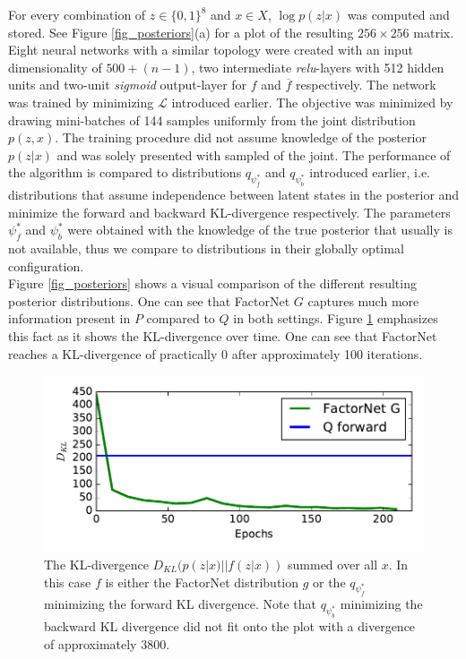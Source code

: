 For every combination of $z \in \{0,1\}^8$ and $x \in X$, $\log p(z|x)$ was computed and stored. See Figure \ref{fig_posteriors}(a) for a plot of the resulting $256 \times 256$ matrix.\\
Eight neural networks with a similar topology were created with an input dimensionality of $500 + (n-1)$, two intermediate \emph{relu}-layers with 512 hidden units and two-unit \emph{sigmoid} output-layer for $f$ and $\overline{f}$ respectively. The network was trained by minimizing $\mathcal{L}$ introduced earlier. The objective was minimized by drawing mini-batches of 144 samples uniformly from the joint distribution $p(z,x)$. The training procedure did not assume knowledge of the posterior $p(z|x)$ and was solely presented with sampled of the joint. The performance of the algorithm is compared to distributions $q_{\psi^*_f}$ and $q_{\psi^*_b}$ introduced earlier, i.e. distributions that assume independence between latent states in the posterior and minimize the forward and backward KL-divergence respectively. The parameters $\psi^*_f$ and $\psi^*_b$ were obtained with the knowledge of the true posterior that usually is not available, thus we compare to distributions in their globally optimal configuration.\\
Figure \ref{fig_posteriors} shows a visual comparison of the different resulting posterior distributions. One can see that FactorNet $G$ captures much more information present in $P$ compared to $Q$ in both settings. Figure \ref{fig_epochs} emphasizes this fact as it shows the KL-divergence over time. One can see that FactorNet reaches a KL-divergence of practically 0 after approximately 100 iterations.

\begin{figure}
\centering
\includegraphics[width=0.9\linewidth]{factornet/epochs.pdf}
\caption[FactorNet: KL-divergence as a function of learning epochs]{The KL-divergence $D_{KL}(p(z|x) || f(z|x))$ summed over all $x$. In this case $f$ is either the FactorNet distribution $g$ or the $q_{\psi^*_f}$ minimizing the forward KL divergence. Note that $q_{\psi^*_b}$ minimizing the backward KL divergence did not fit onto the plot with a divergence of approximately $3800$.}
\label{fig_epochs}
\end{figure}



